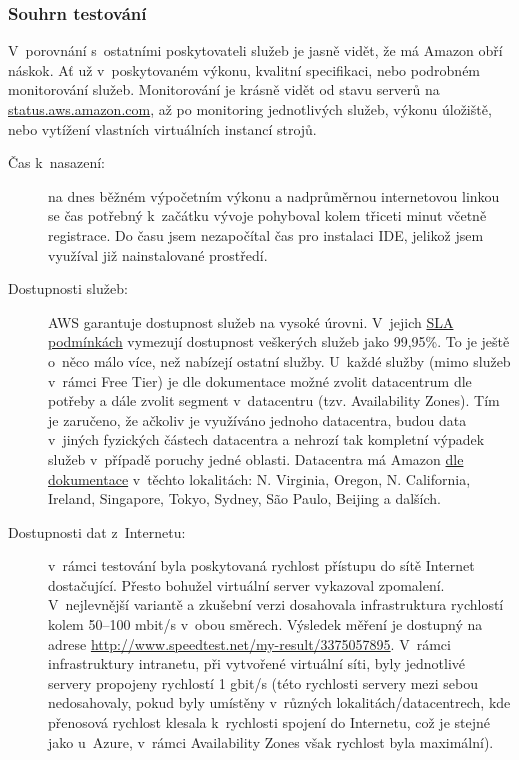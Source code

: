 \subsubsection{Souhrn testování}
V~porovnání s~ostatními poskytovateli služeb je jasně vidět, že má Amazon obří náskok. Ať už v~poskytovaném výkonu, kvalitní specifikaci, nebo podrobném monitorování služeb. Monitorování je krásně vidět od stavu serverů na \href{http://status.aws.amazon.com/}{status.aws.amazon.com}, až po monitoring jednotlivých služeb, výkonu úložiště, nebo vytížení vlastních virtuálních instancí strojů.

\begin{description}
	\item [Čas k~nasazení:] na dnes běžném výpočetním výkonu a nadprůměrnou internetovou linkou se čas potřebný k~začátku vývoje pohyboval kolem třiceti minut včetně registrace. Do času jsem nezapočítal čas pro instalaci IDE, jelikož jsem využíval již nainstalované prostředí.
	\item [Dostupnosti služeb:] AWS garantuje dostupnost služeb na vysoké úrovni. V~jejich \href{http://aws.amazon.com/ec2/sla/}{SLA podmínkách\cite{amazon:sla}} vymezují dostupnost veškerých služeb jako 99,95\%. To je ještě o~něco málo více, než nabízejí ostatní služby. U~každé služby (mimo služeb v~rámci Free Tier) je dle dokumentace možné zvolit datacentrum dle potřeby a dále zvolit segment v~datacentru (tzv. Availability Zones). Tím je zaručeno, že ačkoliv je využíváno jednoho datacentra, budou data v~jiných fyzických částech datacentra a nehrozí tak kompletní výpadek služeb v~případě poruchy jedné oblasti. Datacentra má Amazon \href{http://aws.amazon.com/about-aws/globalinfrastructure/regional-product-services/}{dle dokumentace\cite{amazon:locations}} v~těchto lokalitách: N. Virginia, Oregon, N. California, Ireland, Singapore, Tokyo, Sydney, São Paulo, Beijing a dalších.
	\item [Dostupnosti dat z~Internetu:] v~rámci testování byla poskytovaná rychlost přístupu do sítě Internet dostačující. Přesto bohužel virtuální server vykazoval zpomalení. V~nejlevnější variantě a zkušební verzi dosahovala infrastruktura rychlostí kolem 50--100 mbit/s v~obou směrech. Výsledek měření je dostupný na adrese \href{http://www.speedtest.net/my-result/3375057895}{http://www.speedtest.net/my-result/3375057895}. V~rámci infrastruktury intranetu, při vytvořené virtuální síti, byly jednotlivé servery propojeny rychlostí 1 gbit/s (této rychlosti servery mezi sebou nedosahovaly, pokud byly umístěny v~různých lokalitách/datacentrech, kde přenosová rychlost klesala k~rychlosti spojení do Internetu, což je stejné jako u~Azure, v~rámci Availability Zones však rychlost byla maximální).

\end{description}
